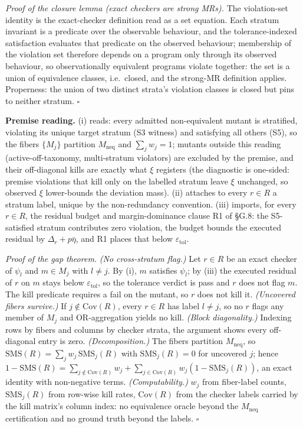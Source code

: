 \documentclass[manuscript,screen,review]{acmart}
\begin{document}
\emph{Proof of the closure lemma (exact checkers are strong MRs).} The
violation-set identity is the exact-checker definition read as a set
equation. Each stratum invariant is a predicate over the observable
behaviour, and the tolerance-indexed satisfaction evaluates that
predicate on the observed behaviour; membership of the violation set
therefore depends on a program only through its observed behaviour, so
observationally equivalent programs violate together: the set is a
union of equivalence classes, i.e.\ closed, and the strong-MR
definition applies. Properness: the union of two distinct strata's
violation classes is closed but pins to neither stratum. $\square$

\textbf{Premise reading.} (i) reads: every admitted non-equivalent
mutant is stratified, violating its unique target stratum (S3 witness)
and satisfying all others (S5), so the fibers $\{M_j\}$ partition
$M_{\mathrm{neq}}$ and $\sum_j w_j = 1$; mutants outside this reading
(active-off-taxonomy, multi-stratum violators) are excluded by the
premise, and their off-diagonal kills are exactly what $\xi$ registers
(the diagnostic is one-sided: premise violations that kill only on the
labelled stratum leave $\xi$ unchanged, so observed $\xi$ lower-bounds
the deviation mass). (ii) attaches to every $r \in R$ a stratum label,
unique by the non-redundancy convention. (iii) imports, for every
$r \in R$, the residual budget and margin-dominance clause R1 of §G.8:
the S5-satisfied stratum contributes zero violation, the budget bounds
the executed residual by $\Delta_r + p\bar\eta$, and R1 places that
below $\varepsilon_{\mathrm{tol}}$.

\emph{Proof of the gap theorem.} \emph{(No cross-stratum flag.)} Let
$r \in R$ be an exact checker of $\psi_l$ and $m \in M_j$ with
$l \neq j$. By (i), $m$ satisfies $\psi_l$; by (iii) the executed
residual of $r$ on $m$ stays below $\varepsilon_{\mathrm{tol}}$, so the
tolerance verdict is pass and $r$ does not flag $m$. The kill predicate
requires a fail on the mutant, so $r$ does not kill it.
\emph{(Uncovered fibers survive.)} If $j \notin \mathrm{Cov}(R)$, every
$r \in R$ has label $l \neq j$, so no $r$ flags any member of $M_j$ and
OR-aggregation yields no kill. \emph{(Block diagonality.)} Indexing rows
by fibers and columns by checker strata, the argument shows every
off-diagonal entry is zero. \emph{(Decomposition.)} The fibers partition
$M_{\mathrm{neq}}$, so
$\mathrm{SMS}(R) = \sum_j w_j\,\mathrm{SMS}_j(R)$ with
$\mathrm{SMS}_j(R) = 0$ for uncovered $j$; hence
$1 - \mathrm{SMS}(R) = \sum_{j \notin \mathrm{Cov}(R)} w_j + \sum_{j \in \mathrm{Cov}(R)} w_j (1 - \mathrm{SMS}_j(R))$,
an exact identity with non-negative terms. \emph{(Computability.)}
$w_j$ from fiber-label counts, $\mathrm{SMS}_j(R)$ from row-wise kill
rates, $\mathrm{Cov}(R)$ from the checker labels carried by the kill
matrix's column index: no equivalence oracle beyond the
$M_{\mathrm{neq}}$ certification and no ground truth beyond the labels.
$\square$
\end{document}
